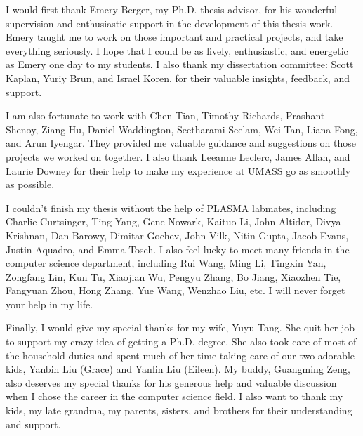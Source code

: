 I would first thank Emery Berger, my Ph.D. thesis advisor, for his wonderful supervision and enthusiastic support in the development of this thesis work. Emery taught me to work on those important and practical projects, and take everything seriously. I hope that I could be as lively, enthusiastic, and energetic as Emery one day to my students. I also thank my dissertation committee: Scott Kaplan, Yuriy Brun, and Israel Koren, for their valuable insights, feedback, and support. 

I am also fortunate to work with Chen Tian, Timothy Richards, Prashant Shenoy, Ziang Hu, Daniel Waddington, Seetharami Seelam, Wei Tan, Liana Fong, and Arun Iyengar. They provided me valuable guidance and suggestions on those projects we worked on together. I also thank Leeanne Leclerc, James Allan, and Laurie Downey for their help to make my experience at UMASS go as smoothly as possible. 

I couldn't finish my thesis without the help of PLASMA  labmates, including Charlie Curtsinger, Ting Yang, Gene Nowark, Kaituo Li, John Altidor, Divya Krishnan, Dan Barowy, Dimitar Gochev, John Vilk, Nitin Gupta, Jacob Evans, Justin Aquadro, and Emma Tosch. I also feel lucky to meet many friends in the computer science department, including Rui Wang, Ming Li, Tingxin Yan, Zongfang Lin, Kun Tu, Xiaojian Wu, Pengyu Zhang, Bo Jiang, Xiaozhen Tie, Fangyuan Zhou, Hong Zhang, Yue Wang, Wenzhao Liu, etc. I will never forget your help in my life. 

Finally, I would give my special thanks for my wife, Yuyu Tang. She quit her job to support my crazy idea of getting a Ph.D. degree. She also took care of most of the household duties and spent much of her time taking care of our two adorable kids, Yanbin Liu (Grace) and Yanlin Liu (Eileen). My buddy, Guangming Zeng, also deserves my special thanks for his generous help and valuable discussion when I chose the career in the computer science field. I also want to thank my kids, my late grandma, my parents, sisters, and brothers for their understanding and support.    

